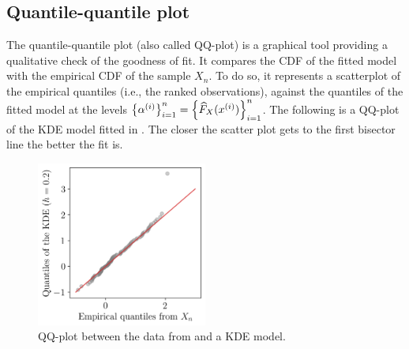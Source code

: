 


\subsection*{Quantile-quantile plot}

The quantile-quantile plot (also called QQ-plot) is a graphical tool providing a qualitative check of the goodness of fit.
It compares the CDF of the fitted model with the empirical CDF of the sample $X_n$.
To do so, it represents a scatterplot of the empirical quantiles (i.e., the ranked observations), against the quantiles of the fitted model at the levels 
$\left\{\alpha^{(i)}\right\}_{i=1}^n = \left\{\widehat{F}_X(x^{(i)})\right\}_{i=1}^n$.
The following  is a QQ-plot of the KDE model fitted in . 
The closer the scatter plot gets to the first bisector line the better the fit is.

\begin{figure}[ht]
    \centering
    \includegraphics[width=0.5\textwidth]{../numerical_experiments/chapter1/figures/qqplot.png}
    \caption{QQ-plot between the data from  and a KDE model.}
    \label{fig:qqplot_kde}
\end{figure}



